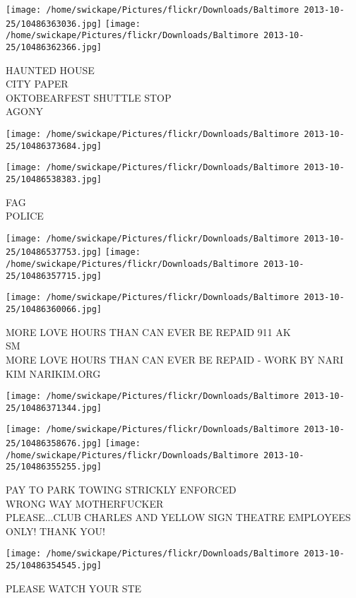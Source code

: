 \documentclass[10pt,letterpaper]{article}
\begin{document}
\texttt{[image: /home/swickape/Pictures/flickr/Downloads/Baltimore 2013-10-25/10486363036.jpg]}
\texttt{[image: /home/swickape/Pictures/flickr/Downloads/Baltimore 2013-10-25/10486362366.jpg]}

HAUNTED HOUSE\\
CITY PAPER\\
OKTOBEARFEST SHUTTLE STOP\\
AGONY
\pagebreak

\texttt{[image: /home/swickape/Pictures/flickr/Downloads/Baltimore 2013-10-25/10486373684.jpg]}

\vspace{0.25in}
\texttt{[image: /home/swickape/Pictures/flickr/Downloads/Baltimore 2013-10-25/10486538383.jpg]}

FAG\\
POLICE
\pagebreak

\texttt{[image: /home/swickape/Pictures/flickr/Downloads/Baltimore 2013-10-25/10486537753.jpg]}
\texttt{[image: /home/swickape/Pictures/flickr/Downloads/Baltimore 2013-10-25/10486357715.jpg]}

\texttt{[image: /home/swickape/Pictures/flickr/Downloads/Baltimore 2013-10-25/10486360066.jpg]}

MORE LOVE HOURS THAN CAN EVER BE REPAID 911 AK\\
SM\\
MORE LOVE HOURS THAN CAN EVER BE REPAID {-} WORK BY NARI KIM NARIKIM.ORG
\pagebreak

\texttt{[image: /home/swickape/Pictures/flickr/Downloads/Baltimore 2013-10-25/10486371344.jpg]}

\vspace{0.25in}
\texttt{[image: /home/swickape/Pictures/flickr/Downloads/Baltimore 2013-10-25/10486358676.jpg]}
\texttt{[image: /home/swickape/Pictures/flickr/Downloads/Baltimore 2013-10-25/10486355255.jpg]}

PAY TO PARK TOWING STRICKLY ENFORCED\\
WRONG WAY MOTHERFUCKER\\
PLEASE...CLUB CHARLES AND YELLOW SIGN THEATRE EMPLOYEES ONLY!  THANK YOU!
\pagebreak

\texttt{[image: /home/swickape/Pictures/flickr/Downloads/Baltimore 2013-10-25/10486354545.jpg]}

PLEASE WATCH YOUR STE
\pagebreak
\end{document}
